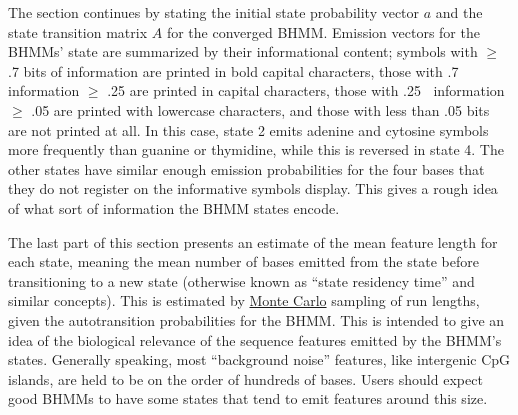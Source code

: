 \documentclass{ut-thesis}
\begin{document}
\begin{NoHyper}
The section continues by stating the initial state probability vector $a$ and the state transition matrix $A$ for the converged BHMM. Emission vectors for the BHMMs' state are summarized by their informational content; symbols with $\geq$ .7 bits of information are printed in bold capital characters, those with .7 $\>$ information $\geq$ .25 are printed in capital characters, those with .25 $\>$ information $\geq$ .05 are printed with lowercase characters, and those with less than .05 bits are not printed at all. In this case, state 2 emits adenine and cytosine symbols more frequently than guanine or thymidine, while this is reversed in state 4. The other states have similar enough emission probabilities for the four bases that they do not register on the informative symbols display. This gives a rough idea of what sort of information the BHMM states encode.

The last part of this section presents an estimate of the mean feature length for each state, meaning the mean number of bases emitted from the state before transitioning to a new state (otherwise known as ``state residency time'' and similar concepts). This is estimated by \hyperref[ssec:MonteCarlo]{Monte Carlo} sampling of run lengths, given the autotransition probabilities for the BHMM. This is intended to give an idea of the biological relevance of the sequence features emitted by the BHMM's states. Generally speaking, most ``background noise'' features, like intergenic CpG islands, are held to be on the order of hundreds of bases. Users should expect good BHMMs to have some states that tend to emit features around this size.


\end{NoHyper}
\end{document}
